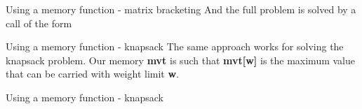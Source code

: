 \documentclass{beamer}
\begin{document}
%

\begin{frame}{Using a memory function - matrix bracketing}
	And the full problem is solved by a call of the form
	
\end{frame}

%

\begin{frame}{Using a memory function - knapsack}
	The same approach works for solving the knapsack problem. Our memory
	\textbf{mvt} is such that \textbf{mvt[w]} is the maximum value that can be
	carried with weight limit \textbf{w}.

	
\end{frame}

%

\begin{frame}{Using a memory function - knapsack}
	
\end{frame}
\end{document}
